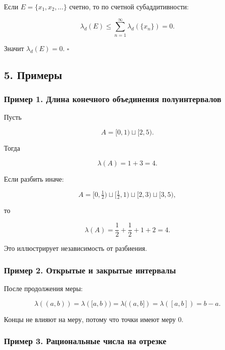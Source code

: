 \documentclass[
  11pt,
  a4paper,
]{article}
\begin{document}
Если \(E=\{x_1,x_2,\ldots\}\) счетно, то по счетной субаддитивности:

\[
\lambda_d(E)
\le
\sum_{n=1}^{\infty}\lambda_d(\{x_n\})
=0.
\]

Значит \(\lambda_d(E)=0\). \(\square\)

\subsection{5. Примеры}\label{ux43fux440ux438ux43cux435ux440ux44b}

\subsubsection{Пример 1. Длина конечного объединения
полуинтервалов}\label{ux43fux440ux438ux43cux435ux440-1.-ux434ux43bux438ux43dux430-ux43aux43eux43dux435ux447ux43dux43eux433ux43e-ux43eux431ux44aux435ux434ux438ux43dux435ux43dux438ux44f-ux43fux43eux43bux443ux438ux43dux442ux435ux440ux432ux430ux43bux43eux432}

Пусть

\[
A=[0,1)\sqcup[2,5).
\]

Тогда

\[
\lambda(A)=1+3=4.
\]

Если разбить иначе:

\[
A=[0,\tfrac12)\sqcup[\tfrac12,1)\sqcup[2,3)\sqcup[3,5),
\]

то

\[
\lambda(A)=\frac12+\frac12+1+2=4.
\]

Это иллюстрирует независимость от разбиения.

\subsubsection{Пример 2. Открытые и закрытые
интервалы}\label{ux43fux440ux438ux43cux435ux440-2.-ux43eux442ux43aux440ux44bux442ux44bux435-ux438-ux437ux430ux43aux440ux44bux442ux44bux435-ux438ux43dux442ux435ux440ux432ux430ux43bux44b}

После продолжения меры:

\[
\lambda((a,b))=\lambda([a,b))=\lambda((a,b])=\lambda([a,b])=b-a.
\]

Концы не влияют на меру, потому что точки имеют меру \(0\).

\subsubsection{Пример 3. Рациональные числа на
отрезке}\label{ux43fux440ux438ux43cux435ux440-3.-ux440ux430ux446ux438ux43eux43dux430ux43bux44cux43dux44bux435-ux447ux438ux441ux43bux430-ux43dux430-ux43eux442ux440ux435ux437ux43aux435}
\end{document}
